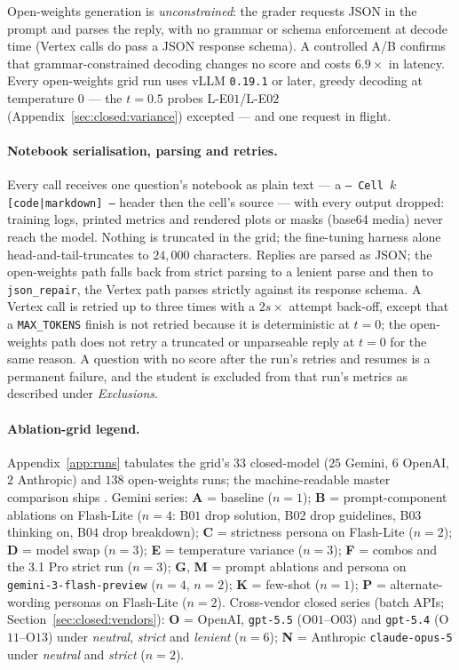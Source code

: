 Open-weights generation is \emph{unconstrained}: the grader requests JSON in the prompt and parses the reply, with no grammar or schema enforcement at decode time (Vertex calls do pass a JSON response schema). A controlled A/B confirms that grammar-constrained decoding changes no score and costs $6.9\times$ in latency. Every open-weights grid run uses vLLM \texttt{0.19.1} or later, greedy decoding at temperature $0$ --- the $t = 0.5$ probes L-E$01$/L-E$02$ (Appendix~\ref{sec:closed:variance}) excepted --- and one request in flight. \paragraph{Notebook serialisation, parsing and retries.}
Every call receives one question's notebook as plain text --- a \texttt{--- Cell $k$ [code|markdown] ---} header then the cell's source --- with every output dropped: training logs, printed metrics and rendered plots or masks (base64 media) never reach the model. Nothing is truncated in the grid; the fine-tuning harness alone head-and-tail-truncates to $24{,}000$ characters. Replies are parsed as JSON; the open-weights path falls back from strict parsing to a lenient parse and then to \texttt{json\_repair}, the Vertex path parses strictly against its response schema. A Vertex call is retried up to three times with a $2s \times$ attempt back-off, except that a \texttt{MAX\_TOKENS} finish is not retried because it is deterministic at $t = 0$; the open-weights path does not retry a truncated or unparseable reply at $t = 0$ for the same reason. A question with no score after the run's retries and resumes is a permanent failure, and the student is excluded from that run's metrics as described under \emph{Exclusions}.

\paragraph{Ablation-grid legend.}
Appendix~\ref{app:runs} tabulates the grid's $33$ closed-model ($25$ Gemini, $6$ OpenAI, $2$ Anthropic) and $138$ open-weights runs; the machine-readable master comparison ships \artifactsin. Gemini series: \textbf{A} = baseline ($n{=}1$); \textbf{B} = prompt-component ablations on Flash-Lite ($n{=}4$: B$01$ drop solution, B$02$ drop guidelines, B$03$ thinking on, B$04$ drop breakdown); \textbf{C} = strictness persona on Flash-Lite ($n{=}2$); \textbf{D} = model swap ($n{=}3$); \textbf{E} = temperature variance ($n{=}3$); \textbf{F} = combos and the 3.1 Pro strict run ($n{=}3$); \textbf{G}, \textbf{M} = prompt ablations and persona on \texttt{gemini-3-flash-preview} ($n{=}4$, $n{=}2$); \textbf{K} = few-shot ($n{=}1$); \textbf{P} = alternate-wording personas on Flash-Lite ($n{=}2$). Cross-vendor closed series (batch APIs; Section~\ref{sec:closed:vendors}): \textbf{O} = OpenAI, \texttt{gpt-5.5} (O$01$--O$03$) and \texttt{gpt-5.4} (O$11$--O$13$) under \emph{neutral}, \emph{strict} and \emph{lenient} ($n{=}6$); \textbf{N} = Anthropic \texttt{claude-opus-5} under \emph{neutral} and \emph{strict} ($n{=}2$).

